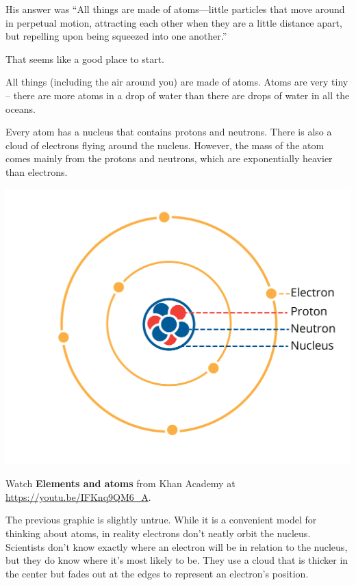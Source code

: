 His answer was ``All things are made of atoms—little particles that move around in
perpetual motion, attracting each other when they are a little
distance apart, but repelling upon being squeezed into one another.''

That seems like a good place to start.

All things (including the air around you) are made of atoms. Atoms are
very tiny -- there are more atoms in a drop of water than there are
drops of water in all the oceans.

Every atom has a nucleus that contains protons and neutrons. There is also
a cloud of electrons flying around the nucleus. However, the mass of the atom
comes mainly from the protons and neutrons, which are exponentially heavier
than electrons.  

\includegraphics[width=1\textwidth]{atom1.png}

Watch \textbf{Elements and atoms} from Khan Academy at \url{https://youtu.be/IFKnq9QM6_A}.


The previous graphic is slightly untrue. While it is a convenient model for thinking about atoms, in reality electrons don't neatly orbit the nucleus. Scientists don't know exactly where an electron will be in relation to the nucleus, but they do know where it's most likely to be. They use a cloud that is thicker in the center but fades out at the edges to represent an electron's position.


